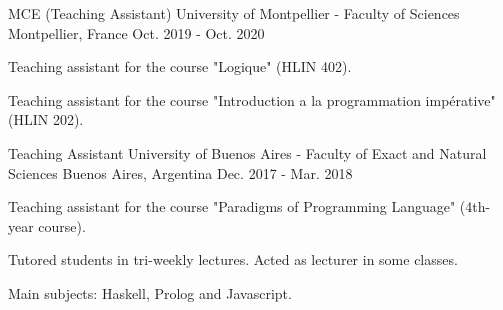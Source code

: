 

\begin{cventries}

\cventry
{MCE (Teaching Assistant)} %
{University of Montpellier - Faculty of Sciences} %
{Montpellier, France} %
{Oct. 2019 - Oct. 2020} %
{
  \begin{cvitems} %
    \item Teaching assistant for the course "Logique" (HLIN 402).
    \item Teaching assistant for the course "Introduction a la programmation imp\'erative" (HLIN 202).
  \end{cvitems}
}

\cventry
{Teaching Assistant} %
{University of Buenos Aires - Faculty of Exact and Natural Sciences} %
{Buenos Aires, Argentina} %
{Dec. 2017 - Mar. 2018} %
{
  \begin{cvitems} %
    \item Teaching assistant for the course "Paradigms of Programming Language" (4th-year course). 
    \item Tutored students in tri-weekly lectures. Acted as lecturer in some classes.
    \item Main subjects: Haskell, Prolog and Javascript.
  \end{cvitems}
}

\end{cventries}
